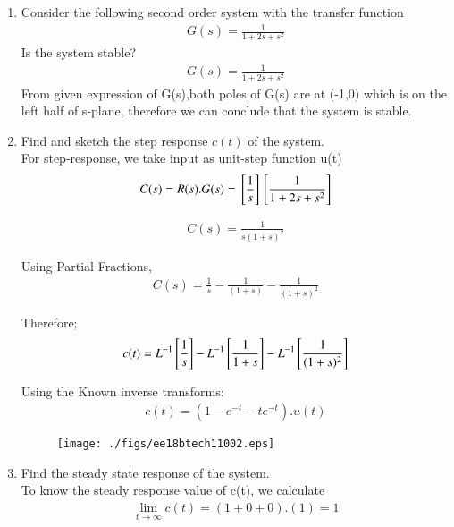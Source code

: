 \begin{enumerate}[label=\thesection.\arabic*.,ref=\thesection.\theenumi]
\item
Consider the following second order system with the transfer function
\begin{align}
G(s) = \frac{1}{1+2s+s^2}
\end{align}
Is the system stable? 
\\
\solution 
\begin{align}
G(s) = \frac{1}{1+2s+s^2}
\end{align}
From given expression of G(s),both poles of G(s) are at (-1,0) which is on the left half of s-plane, therefore we can conclude that the system is stable.
\item Find and sketch the step response $c(t)$ of the system.
\\
\solution 
For step-response, we take input as unit-step function u(t)
\begin{align}
C(s) = R(s).G(s) = {}\left[\frac{1}{s}\right] {}\left[\frac{1}{1+2s+s^2}\right]
\end{align}

\begin{align}
C(s) =  \frac{1}{s(1+s)^2}
\end{align}



Using Partial Fractions,
\begin{align}
C(s) = \frac{1}{s} - \frac{1}{(1+s)} - \frac{1}{(1+s)^2}
\end{align}


Therefore;
\begin{align}
c(t) = L^{-1} {}\left[ \frac{1}{s}\right] - L^{-1}{}\left[\frac{1}{1+s}\right] - L^{-1}{}\left[\frac{1}{(1+s)^2}\right] 
\end{align}

Using the Known inverse transforms:
\begin{align}
c(t) = (1 - e^{-t} - te^{-t}) . u(t)
\end{align}

\begin{figure}
\centering
\texttt{[image: ./figs/ee18btech11002.eps]}
\caption{}
\label{fig:sec_order}
\end{figure}
\item Find the steady state response of the system.
\\
\solution 
To know the steady response value of c(t), we calculate 
\begin{align}
\lim_{t\to\infty} c(t) = (1+0+0).(1) = 1
\end{align}


\end{enumerate}
